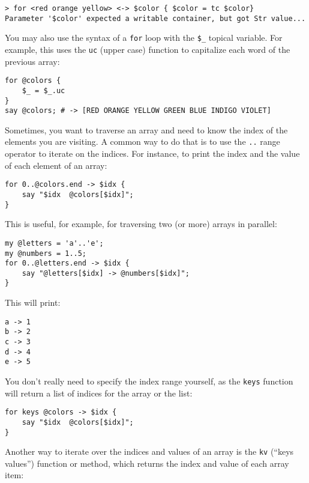 \begin{verbatim}
> for <red orange yellow> <-> $color { $color = tc $color}
Parameter '$color' expected a writable container, but got Str value...
\end{verbatim}

You may also use the syntax of a {\tt for} loop with the 
\verb'$_' topical variable. For example, this uses the
{\tt uc} (upper case) function to capitalize each word of 
the previous array:

\begin{verbatim}
for @colors { 
    $_ = $_.uc 
}
say @colors; # -> [RED ORANGE YELLOW GREEN BLUE INDIGO VIOLET]
\end{verbatim}
%

Sometimes, you want to traverse an array and need to know the 
index of the elements you are visiting. A common way to do 
that is to use the \verb'..' range operator to iterate on 
the indices. For instance, to print the index and the value of each element of an array:

\begin{verbatim}
for 0..@colors.end -> $idx { 
    say "$idx  @colors[$idx]"; 
}
\end{verbatim}

This is useful, for example, for traversing two (or more) arrays 
in parallel:

\begin{verbatim}
my @letters = 'a'..'e';
my @numbers = 1..5;
for 0..@letters.end -> $idx { 
    say "@letters[$idx] -> @numbers[$idx]"; 
}
\end{verbatim}
%

This will print:
\begin{verbatim}
a -> 1
b -> 2
c -> 3
d -> 4
e -> 5
\end{verbatim}

You don't really need to specify the index range yourself, as 
the {\tt keys} function will return a list of indices for 
the array or the list:

\begin{verbatim}
for keys @colors -> $idx { 
    say "$idx  @colors[$idx]"; 
}
\end{verbatim}

Another way to iterate over the indices and values of an 
array is the {\tt kv} (``keys values'') function or method, 
which returns the index and value of each array item:

